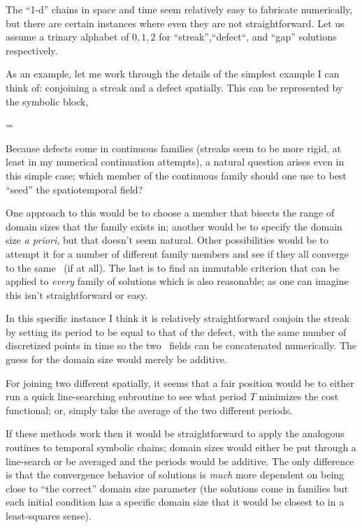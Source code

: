 \begin{description}
{The ``1-d'' chains in space and time seem relatively easy to fabricate numerically, but there are certain instances
where even they are not straightforward.
Let us assume a trinary alphabet of ${0,1,2}$ for ``streak'',``defect``, and ``gap'' solutions
respectively.

As an example, let me work through the details of the simplest example I can think of:
conjoining a streak and a defect spatially. This can be represented by the symbolic block,

\beq
\Mm=\left[\begin{array}{c}
1 0
\end{array}\right]

Because defects come in continuous families (streaks seem to be more rigid, at least in my numerical
continuation attempts), a natural question arises even in this simple case;
which member of the continuous family should one use to best ``seed'' the spatiotemporal
field?

One approach to this would be to choose a member that bisects the range of domain sizes
that the family exists in; another would be to specify the domain size \textit{a priori},
but that doesn't seem natural. Other possibilities would be to attempt it for a number of different
family members and see if they all converge to the same \twot\ (if at all). The last is to find an
immutable criterion that can be applied to \emph{every} family of solutions which is also reasonable; as
one can imagine this isn't straightforward or easy.

In this specific instance I think it is relatively straightforward conjoin the streak
by setting its period to be equal to that of the defect, with the same number of discretized
points in time so the two \spt\ fields can be concatenated numerically. The guess for the domain
size would merely be additive.

For joining two different {\twots} spatially, it seems that a fair position
would be to either run a quick line-searching subroutine to see what period $T$ minimizes the
cost functional; or, simply take the average of the two different periods.

If these methods work then it would be straightforward to apply the analogous routines
to temporal symbolic chains; domain sizes would either be put through a line-search or be
averaged and the periods would be additive. The only difference is that the convergence
behavior of solutions is \emph{much} more dependent on being close to ``the correct'' domain
size parameter (the solutions come in families but each initial condition has a specific
domain size that it would be closest to in a least-squares sense).

}
\end{description}
